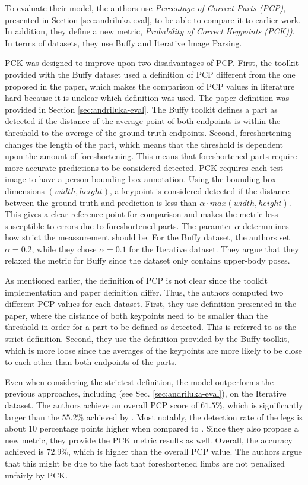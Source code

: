 
To evaluate their model, the authors use \textit{Percentage of Correct Parts (PCP)}, presented in Section \ref{sec:andriluka-eval}, to be able to compare it to earlier work.
In addition, they define a new metric, \textit{Probability of Correct Keypoints (PCK))}.
In terms of datasets, they use Buffy and Iterative Image Parsing. 

PCK was designed to improve upon two disadvantages of PCP.
First, the toolkit provided with the Buffy dataset \cite{ferrari_progressive_2008} used a definition of PCP different from the one proposed in the paper, which makes the comparison of PCP values in literature hard because it is unclear which definition was used.
The paper definition was provided in Section \ref{sec:andriluka-eval}.
The Buffy toolkit defines a part as detected if the distance of the average point of both endpoints is within the threshold to the average of the ground truth endpoints.
Second, foreshortening changes the length of the part, which means that the threshold is dependent upon the amount of foreshortening.
This means that foreshortened parts require more accurate predictions to be considered detected.
PCK requires each test image to have a person bounding box annotation.
Using the bounding box dimensions $(width, height)$, a keypoint is considered detected if the distance between the ground truth and prediction is less than $\alpha \cdot max(width, height)$.
This gives a clear reference point for comparison and makes the metric less susceptible to errors due to foreshortened parts.
The paramter $\alpha$ determmines how strict the meassurement should be.
For the Buffy dataset, the authors set $\alpha = 0.2$, while they chose $\alpha = 0.1$ for the Iterative dataset.
They argue that they relaxed the metric for Buffy since the dataset only contains upper-body poses.

As mentioned earlier, the definition of PCP is not clear since the toolkit implementation and paper definition differ.
Thus, the authors computed two different PCP values for each dataset.
First, they use definition presented in the paper, where the distance of both keypoints need to be smaller than the threshold in order for a part to be defined as detected.
This is referred to as the strict definition.
Second, they use the definition provided by the Buffy toolkit, which is more loose since the averages of the keypoints are more likely to be close to each other than both endpoints of the parts.

Even when considering the strictest definition, the model outperforms the previous approaches, including \cite{andriluka_pictorial_2009} (see Sec. \ref{sec:andriluka-eval}), on the Iterative dataset.
The authors achieve an overall PCP score of $61.5\%$, which is significantly larger than the $55.2\%$ achieved by \cite{andriluka_pictorial_2009}.
Most notably, the detection rate of the legs is about $10$ percentage points higher when compared to \cite{andriluka_pictorial_2009}.
Since they also propose a new metric, they provide the PCK metric results as well.
Overall, the accuracy achieved is $72.9\%$, which is higher than the overall PCP value.
The authors argue that this might be due to the fact that foreshortened limbs are not penalized unfairly by PCK. 

